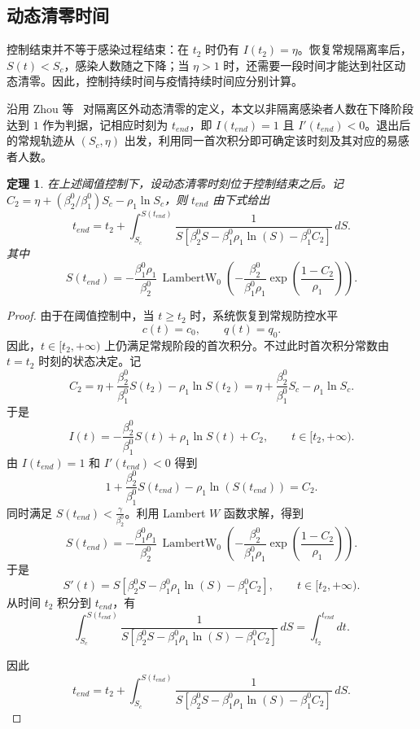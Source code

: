 \documentclass[UTF8,a4paper,10pt,fontset=fandol]{ctexart}
\theoremstyle{cnplain}
\newtheorem{theorem}{定理}[section]
\theoremstyle{remark}
\numberwithin{equation}{section}
\begin{document}
\subsection{动态清零时间}
控制结束并不等于感染过程结束：在 $t_2$ 时仍有 $I(t_2)=\eta$。恢复常规隔离率后，$S(t)<S_c$，感染人数随之下降；当 $\eta>1$ 时，还需要一段时间才能达到社区动态清零。因此，控制持续时间与疫情持续时间应分别计算。

沿用 Zhou 等~\cite{Zhou2024SPCI} 对隔离区外动态清零的定义，本文以非隔离感染者人数在下降阶段达到 $1$ 作为判据，记相应时刻为 $t_{end}$，即 $I(t_{end})=1$ 且 $I'(t_{end})<0$。退出后的常规轨迹从 $(S_c,\eta)$ 出发，利用同一首次积分即可确定该时刻及其对应的易感者人数。
\begin{theorem}\label{thm:s1:tend}
    在上述阈值控制下，设动态清零时刻位于控制结束之后。记 $C_2=\eta+(\beta_2^0/\beta_1^0)S_c-\rho_1\ln S_c$，则 $t_{end}$ 由下式给出
    \[
    t_{end}=t_2+\int_{S_c}^{S(t_{end})}\frac{1}
    {S\left[\beta_2^0 S-\beta_1^0 \rho_1 \ln(S)-
    \beta_1^0 C_2\right]}\, dS .
    \]
    其中
    \begin{equation}
    S(t_{end})=
    -\frac{\beta_1^0 \rho_1}{\beta_2^0}\,
    \operatorname{LambertW}_0
    \left(
    -\frac{\beta_2^0}{\beta_1^0 \rho_1}
    \exp\left(
    \frac{1-C_2}{\rho_1}
    \right)
    \right).
    \label{eq:s1:Send}
    \end{equation}
\end{theorem}
\begin{proof}
    由于在阈值控制中，当 $t\ge t_2$ 时，系统恢复到常规防控水平
    \[
    c(t)=c_0,\qquad q(t)=q_0.
    \]
    因此，$t\in[t_2,+\infty)$ 上仍满足常规阶段的首次积分。不过此时首次积分常数由
    $t=t_2$ 时刻的状态决定。记
    \[
    C_2=\eta+\frac{\beta_2^0}{\beta_1^0}S(t_2)-\rho_1\ln S(t_2)=\eta+\frac{\beta_2^0}{\beta_1^0}S_c-\rho_1\ln S_c.
    \]
    于是
    \[
    I(t)
    =
    -\frac{\beta_2^0}{\beta_1^0} S(t)
    +
    \rho_1 \ln S(t)
    +
    C_2,
    \qquad
    t \in [t_2,+\infty).
    \]
    由 $I(t_{end})=1$ 和 $I'(t_{end})<0$ 得到
    \[
    1
    +
    \frac{\beta_2^0}{\beta_1^0} S(t_{end})
    -
    \rho_1 \ln(S(t_{end}))
    =
    C_2 .
    \]
    同时满足 $S(t_{end})<\frac{\gamma}{\beta_2^0}$。利用 Lambert $W$ 函数求解，得到
    \[
    S(t_{end})=
    -\frac{\beta_1^0 \rho_1}{\beta_2^0}\,
    \operatorname{LambertW}_0
    \left(
    -\frac{\beta_2^0}{\beta_1^0 \rho_1}
    \exp\left(
    \frac{1-C_2}{\rho_1}
    \right)
    \right).
    \]
    于是
    \[
    S'(t)=S\left[\beta_2^0 S-
    \beta_1^0 \rho_1 \ln(S)
    -\beta_1^0 C_2
    \right],
    \qquad
    t \in [t_2,+\infty).
    \]
    从时间 $t_2$ 积分到 $t_{end}$，有
    \[
    \int_{S_c}^{S(t_{end})}
    \frac{1}
    {
    S\left[
    \beta_2^0 S
    -
    \beta_1^0 \rho_1 \ln(S)
    -
    \beta_1^0 C_2
    \right]
    }
    \, dS
    =
    \int_{t_2}^{t_{end}} dt .
    \]

    因此
    \[
    t_{end}=t_2+\int_{S_c}^{S(t_{end})}\frac{1}
    {S\left[\beta_2^0 S-\beta_1^0 \rho_1 \ln(S)-
    \beta_1^0 C_2\right]}\, dS .
    \]
\end{proof}
\end{document}
